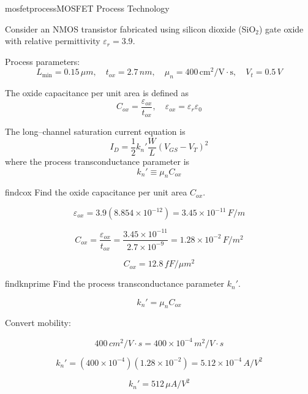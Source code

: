 \begin{mainquestion}{mosfetprocess}{MOSFET Process Technology}

\questionpoints Consider an NMOS transistor fabricated using silicon dioxide (SiO$_2$) gate oxide 
with relative permittivity $\varepsilon_r = 3.9$.

Process parameters:
\[
L_{\min} = 0.15\,\mu m, \quad
t_{ox} = 2.7\,nm, \quad
\mu_n = 400\,\mathrm{cm^2/V\cdot s}, \quad
V_t = 0.5\,V
\]

The oxide capacitance per unit area is defined as
\[
C_{ox} = \frac{\varepsilon_{ox}}{t_{ox}}, \quad
\varepsilon_{ox} = \varepsilon_r \varepsilon_0
\]

The long–channel saturation current equation is
\[
I_D=\frac{1}{2}k_n'\frac{W}{L}(V_{GS}-V_T)^2
\]
where the process transconductance parameter is
\[
k_n' \equiv \mu_n C_{ox}
\]


\begin{partquestion}{findcox}
{Find the oxide capacitance per unit area $C_{ox}$.}

\begin{answer}
\[
\varepsilon_{ox} = 3.9(8.854\times10^{-12}) 
= 3.45\times10^{-11}\,F/m
\]

\[
C_{ox} = \frac{\varepsilon_{ox}}{t_{ox}}
= \frac{3.45\times10^{-11}}{2.7\times10^{-9}}
= 1.28\times10^{-2}\,F/m^2
\]

\[
C_{ox} = 12.8\,fF/\mu m^2
\]
\end{answer}

\end{partquestion}

\begin{partquestion}{findknprime}
{Find the process transconductance parameter $k_n'$.}

\begin{answer}
\[
k_n'=\mu_n C_{ox}
\]

Convert mobility:

\[
400\,cm^2/V\cdot s = 400\times10^{-4}\,m^2/V\cdot s
\]

\[
k_n'=(400\times10^{-4})(1.28\times10^{-2})
=5.12\times10^{-4}\,A/V^2
\]

\[
k_n' = 512\,\mu A/V^2
\]
\end{answer}

\pagebreak
\end{partquestion}


\end{mainquestion}
